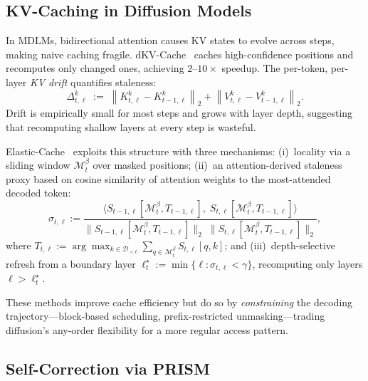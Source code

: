 \documentclass[11pt]{article}
\newcommand{\cM}{\mathcal{M}}
\newcommand{\cD}{\mathcal{D}}
\begin{document}
\subsection{KV-Caching in Diffusion Models}
\label{sec:bg_dkv}

In MDLMs, bidirectional attention causes KV states to evolve across steps, making naive caching fragile.
dKV-Cache~\cite{ma2025dkv} caches high-confidence positions and recomputes only changed ones, achieving $2$--$10\times$ speedup.
The per-token, per-layer \emph{KV drift} quantifies staleness:
\begin{equation}
    \Delta^{k}_{t,\ell}
    \;:=\;
    \left\lVert K^{k}_{t,\ell} - K^{k}_{t-1,\ell} \right\rVert_2
    +
    \left\lVert V^{k}_{t,\ell} - V^{k}_{t-1,\ell} \right\rVert_2.
    \label{eq:kv_drift}
\end{equation}
Drift is empirically small for most steps and grows with layer depth, suggesting that recomputing shallow layers at every step is wasteful.

Elastic-Cache~\cite{elastic_cache} exploits this structure with three mechanisms: (i)~locality via a sliding window $\cM_t^\beta$ over masked positions; (ii)~an attention-derived staleness proxy based on cosine similarity of attention weights to the most-attended decoded token:
\begin{equation}
    \sigma_{t,\ell}
    :=
    \frac{
      \langle S_{t-1,\ell}[\cM_t^\beta, T_{t-1,\ell}],\; S_{t,\ell}[\cM_t^\beta, T_{t-1,\ell}] \rangle
    }{
      \| S_{t-1,\ell}[\cM_t^\beta, T_{t-1,\ell}] \|_2 \;
      \| S_{t,\ell}[\cM_t^\beta, T_{t-1,\ell}] \|_2
    },
    \label{eq:attn_cosine}
\end{equation}
where $T_{t,\ell} := \arg\max_{k \in \cD_{<t}} \sum_{q \in \cM_t^\beta} S_{t,\ell}[q,k]$; and (iii)~depth-selective refresh from a boundary layer $\ell_t^\star := \min\{\ell : \sigma_{t,\ell} < \gamma\}$, recomputing only layers $\ell > \ell_t^\star$.

These methods improve cache efficiency but do so by \emph{constraining} the decoding trajectory---block-based scheduling, prefix-restricted unmasking---trading diffusion's any-order flexibility for a more regular access pattern.

\subsection{Self-Correction via PRISM}
\label{sec:bg_prism}
\end{document}
